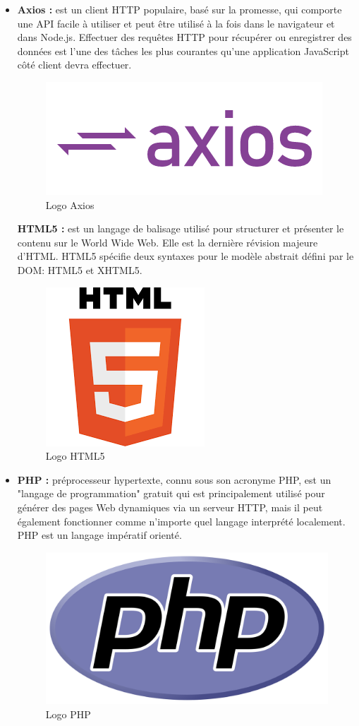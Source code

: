\begin{itemize}
	\item \textbf{Axios\cite{axios} :} est un client HTTP populaire, basé sur la promesse, qui comporte une API facile à utiliser et peut être utilisé à la fois dans le navigateur et dans Node.js. Effectuer des requêtes HTTP pour récupérer ou enregistrer des données est l'une des tâches les plus courantes qu'une application JavaScript côté client devra effectuer.
	\begin{figure}[H]
		\centering
		\includegraphics[width=0.3\linewidth]{img/logos/axios}
		\caption[Logo Axios]{Logo Axios}
		\label{fig:axios}
	\end{figure}
	
	\textbf{HTML5\cite{html} :} est un langage de balisage utilisé pour structurer et présenter le contenu sur le World Wide Web. Elle est la dernière révision majeure d'HTML. HTML5 spécifie deux syntaxes pour le modèle abstrait défini par le DOM: HTML5 et XHTML5.
	\begin{figure}[H]
		\centering
		\includegraphics[width=0.2\linewidth]{img/logos/html5}
		\caption[Logo HTML5]{Logo HTML5}
		\label{fig:html5}
	\end{figure}
	
	\item \textbf{PHP\cite{php} :} préprocesseur hypertexte, connu sous son acronyme PHP, est un "langage de programmation" gratuit qui est principalement utilisé pour générer des pages Web dynamiques via un serveur HTTP, mais il peut également fonctionner comme n'importe quel langage interprété localement. PHP est un langage impératif orienté.
	\begin{figure}[H]
		\centering
		\includegraphics[width=0.2\linewidth]{img/logos/php}
		\caption[Logo PHP]{Logo PHP}
		\label{fig:php}
	\end{figure}
	

\end{itemize}
